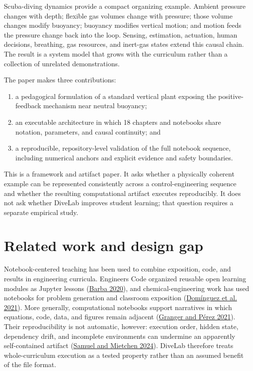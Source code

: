 \documentclass[
]{article}
\providecommand{\tightlist}{%
  \setlength{\itemsep}{0pt}\setlength{\parskip}{0pt}}
\begin{document}
Scuba-diving dynamics provide a compact organizing example. Ambient
pressure changes with depth; flexible gas volumes change with pressure;
those volume changes modify buoyancy; buoyancy modifies vertical motion;
and motion feeds the pressure change back into the loop. Sensing,
estimation, actuation, human decisions, breathing, gas resources, and
inert-gas states extend this causal chain. The result is a system model
that grows with the curriculum rather than a collection of unrelated
demonstrations.

The paper makes three contributions:

\begin{enumerate}
\def\labelenumi{\arabic{enumi}.}
\tightlist
\item
  a pedagogical formulation of a standard vertical plant exposing the
  positive-feedback mechanism near neutral buoyancy;
\item
  an executable architecture in which 18 chapters and notebooks share
  notation, parameters, and causal continuity; and
\item
  a reproducible, repository-level validation of the full notebook
  sequence, including numerical anchors and explicit evidence and safety
  boundaries.
\end{enumerate}

This is a framework and artifact paper. It asks whether a physically
coherent example can be represented consistently across a
control-engineering sequence and whether the resulting computational
artifact executes reproducibly. It does not ask whether DiveLab improves
student learning; that question requires a separate empirical study.

\hypertarget{related-work-and-design-gap}{%
\section{Related work and design
gap}\label{related-work-and-design-gap}}

Notebook-centered teaching has been used to combine exposition, code,
and results in engineering curricula. Engineers Code organized reusable
open learning modules as Jupyter lessons
(\protect\hyperlink{ref-barba2020}{Barba 2020}), and
chemical-engineering work has used notebooks for problem generation and
classroom exposition (\protect\hyperlink{ref-dominguez2021}{Domínguez et
al. 2021}). More generally, computational notebooks support narratives
in which equations, code, data, and figures remain adjacent
(\protect\hyperlink{ref-granger2021}{Granger and Pérez 2021}). Their
reproducibility is not automatic, however: execution order, hidden
state, dependency drift, and incomplete environments can undermine an
apparently self-contained artifact
(\protect\hyperlink{ref-samuel2024}{Samuel and Mietchen 2024}). DiveLab
therefore treats whole-curriculum execution as a tested property rather
than an assumed benefit of the file format.
\end{document}

